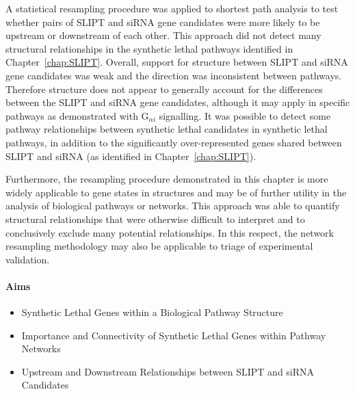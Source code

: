 A statistical resampling procedure was applied to \gls{shortest path} analysis to test whether pairs of \gls{SLIPT} and \gls{siRNA} gene candidates were more likely to be upstream or downstream of each other. This approach did not detect many structural relationships in the \gls{synthetic lethal} \glspl{pathway} identified in Chapter~\ref{chap:SLIPT}. Overall, support for  structure between \gls{SLIPT} and \gls{siRNA} gene candidates was weak and the direction was inconsistent between \glspl{pathway}. Therefore  structure does not appear to generally account for the differences between the \gls{SLIPT} and \gls{siRNA} gene candidates, although it may apply in specific \glspl{pathway} as demonstrated with G$_{\alpha i}$ signalling. It was possible to detect some \gls{pathway} relationships between \gls{synthetic lethal} candidates in \gls{synthetic lethal} \glspl{pathway}, in addition to the significantly over-represented genes shared between \gls{SLIPT} and \gls{siRNA} (as identified in  Chapter~\ref{chap:SLIPT}).

Furthermore, the resampling procedure demonstrated in this chapter is more widely applicable to gene states in  structures and may be of further utility in the analysis of biological \glspl{pathway} or networks. This approach was able to quantify structural relationships that were otherwise difficult to interpret and to conclusively exclude many potential relationships. In this respect, the network resampling methodology may also be applicable to triage of experimental validation.

\clearpage

\iffalse
\paragraph{Aims}

  \begin{itemize}
   \item Synthetic Lethal Genes within a Biological Pathway Structure
   
   \bigskip
   
   \item Importance and Connectivity of Synthetic Lethal Genes within Pathway Networks
   
   \bigskip
   
   \item Upstream and Downstream Relationships between SLIPT and \gls{siRNA} Candidates
  \end{itemize}

